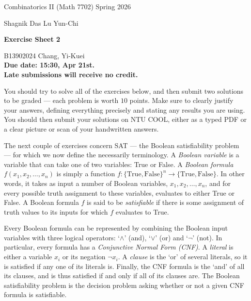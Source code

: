 \documentclass[a4paper,12pt]{article}
\newcommand{\courseTitle}{Combinatorics II (Math 7702)}
\newcommand{\semester}{Spring 2026}
\newcommand{\instructorA}{Shagnik Das}
\newcommand{\instructorB}{Lu Yun-Chi}
\newcommand{\sheetNumber}{2}
\newcommand{\dueDate}{15:30, Apr 21st.}
\newcommand{\lateWarning}{Late submissions will receive no credit.}
\newcommand{\buildtitle}[4]{
\begin{flushleft}
{\large
#1
\hfill{}
#2
\par
#3
}
\end{flushleft}
\vskip 4pt
\begin{center}
{\large\bfseries#4\par}
\end{center}
\bigskip
}
\begin{document}
\buildtitle{\courseTitle{}}{\semester}{\instructorA{} \hfill \instructorB{}}{Exercise Sheet \sheetNumber{}}

\vspace{-0.2in}

\begin{center}

{B13902024 Chang, Yi-Kuei \\ \bf Due date: \dueDate \\ \lateWarning}

\end{center}

\noindent You should try to solve all of the exercises below, and then submit two solutions to be graded --- each problem is worth $10$ points. Make sure to clearly justify your answers, defining everything precisely and stating any results you are using. You should then submit your solutions on NTU COOL, either as a typed PDF or a clear picture or scan of your handwritten answers.

\medskip

\noindent The next couple of exercises concern SAT --- the Boolean satisfiability problem --- for which we now define the necessarily terminology.  A \emph{Boolean variable} is a variable that can take one of two variables: True or False.  A \emph{Boolean formula} $f(x_1, x_2, \hdots, x_n)$ is simply a function $f: \{\textrm{True}, \textrm{False} \}^n \rightarrow \{ \textrm{True}, \textrm{False} \}$.  In other words, it takes as input a number of Boolean variables, $x_1, x_2, \hdots, x_n$, and for every possible truth assignment to these variables, evaluates to either True or False.  A Boolean formula $f$ is said to be \emph{satisfiable} if there is some assignment of truth values to its inputs for which $f$ evaluates to True.

Every Boolean formula can be represented by combining the Boolean input variables with three logical operators: `$\wedge$' (and), `$\vee$' (or) and `$\neg$' (not).  In particular, every formula has a \emph{Conjunctive Normal Form (CNF)}.  A \emph{literal} is either a variable $x_i$ or its negation $\neg x_i$.  A \emph{clause} is the `or' of several literals, so it is satisfied if any one of its literals is.  Finally, the CNF formula is the `and' of all its clauses, and is thus satisfied if and only if all of its clauses are.  The Boolean satisfiability problem is the decision problem asking whether or not a given CNF formula is satisfiable.
\end{document}
